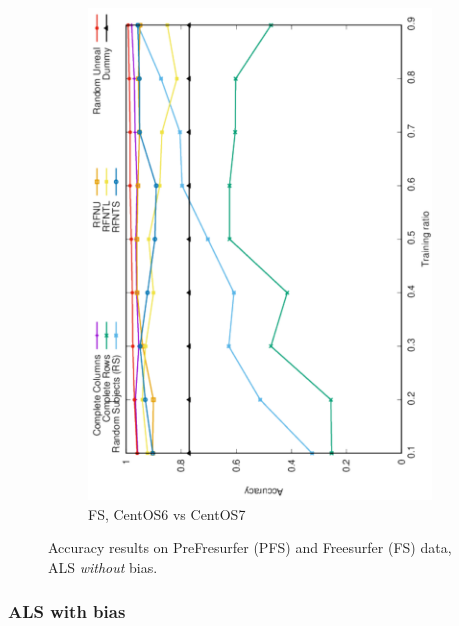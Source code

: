 \documentclass[10pt, conference, compsocconf]{IEEEtran}
\begin{document}
\begin{figure}
\begin{subfigure}[b]{0.4\linewidth}
        \includegraphics[width=0.8\columnwidth, angle=-90]{data/results/means_of_results/ALS/FS-100files/ALS-FS100files.pdf}
        \caption{FS, CentOS6 vs CentOS7}
\end{subfigure}
\caption{Accuracy results on PreFresurfer (PFS) and Freesurfer (FS) data, ALS \emph{without} bias.}
\label{fig:results-real-als}
\end{figure}

\subsubsection{ALS with bias}
\end{document}
